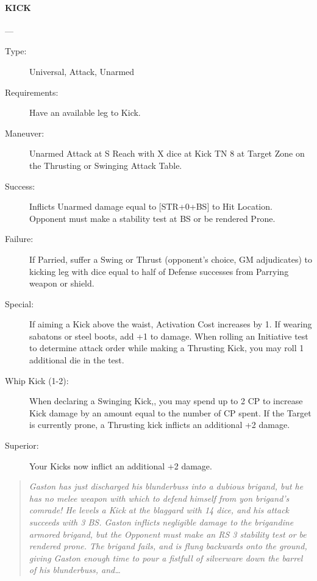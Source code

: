 \documentclass[oneside,11pt,english]{book}
\begin{document}
\paragraph{\large\label{man:KICK} KICK}---\quad{\large[X]}
\vspace{-10pt}\begin{description} 
\item [Type:] Universal, Attack, Unarmed 
\item [Requirements:] Have an available leg to Kick. 
\item [Maneuver:] Unarmed Attack at S Reach with X dice at Kick TN 8 at Target Zone on the Thrusting or 
Swinging Attack Table. 
\item [Success:] Inflicts Unarmed damage equal to [STR+0+BS] to Hit Location. Opponent must make a stability 
test at BS or be rendered Prone. 
\item [Failure:] If Parried, suffer a Swing or Thrust (opponent’s choice, GM adjudicates) to kicking leg with 
dice equal to half of Defense successes from Parrying weapon or shield. 
\item [Special:] If aiming a Kick above the waist, Activation Cost increases by 1. If wearing sabatons or steel 
boots, add +1 to damage. 
When rolling an Initiative test to determine attack order while making a Thrusting Kick, you may roll 1 
additional die in the test. 
\item [Whip Kick (1-2):] When declaring a Swinging Kick,, you may spend up to 2 CP to increase Kick damage 
by an amount equal to the number of CP spent. 
If the Target is currently prone, a Thrusting kick inflicts an additional +2 damage. 
\item [Superior:] Your Kicks now inflict an additional +2 damage. 
\end{description}
\begin{quotation}
\emph{Gaston has just discharged his blunderbuss into a dubious brigand, but he has no melee weapon with which to defend himself 
from yon brigand’s comrade! He levels a Kick at the blaggard with 14 dice, and his attack succeeds with 3 BS. Gaston inflicts 
negligible damage to the brigandine armored brigand, but the Opponent must make an RS 3 stability test or be rendered prone. 
The brigand fails, and is flung backwards onto the ground, giving Gaston enough time to pour a fistfull of silverware down the 
barrel of his blunderbuss, and\ldots}
\end{quotation}
\end{document}
